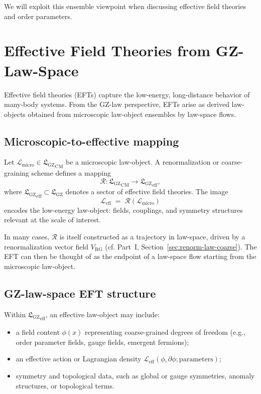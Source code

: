 \documentclass[11pt]{book}
\newcommand{\GZLS}{\ensuremath{\mathfrak{L}_{\mathrm{GZ}}}}
\theoremstyle{plain}
\theoremstyle{definition}
\theoremstyle{remark}
\begin{document}
We will exploit this ensemble viewpoint when discussing effective
field theories and order parameters.

\section{Effective Field Theories from GZ-Law-Space}
\label{sec:eft-from-gzlaw}


Effective field theories (EFTs) capture the low-energy, long-distance
behavior of many-body systems. From the GZ-law perspective, EFTs
arise as derived law-objects obtained from microscopic law-object
ensembles by law-space flows.

\subsection*{Microscopic-to-effective mapping}

Let $\mathcal{L}_{\mathrm{micro}} \in {\GZLS}_{\mathrm{CM}}$ be a
microscopic law-object. A renormalization or coarse-graining scheme
defines a mapping
\[
   \mathcal{R} \colon {\GZLS}_{\mathrm{CM}} \longrightarrow
   {\GZLS}_{\mathrm{eff}},
\]
where ${\GZLS}_{\mathrm{eff}} \subset \GZLS$ denotes a sector of
effective field theories. The image
\[
   \mathcal{L}_{\mathrm{eff}}
   \;=\;
   \mathcal{R}(\mathcal{L}_{\mathrm{micro}})
\]
encodes the low-energy law-object: fields, couplings, and symmetry
structures relevant at the scale of interest.

In many cases, $\mathcal{R}$ is itself constructed as a trajectory
in law-space, driven by a renormalization vector field
$V_{\mathrm{RG}}$ (cf. Part~I, Section~\ref{sec:renorm-law-coarse}).
The EFT can then be thought of as the endpoint of a law-space flow
starting from the microscopic law-object.

\subsection*{GZ-law-space EFT structure}

Within ${\GZLS}_{\mathrm{eff}}$, an effective law-object may include:
\begin{itemize}
  \item a field content $\phi(x)$ representing coarse-grained
        degrees of freedom (e.g., order parameter fields, gauge
        fields, emergent fermions);
  \item an effective action or Lagrangian density
        $\mathcal{L}_{\mathrm{eff}}(\phi,\partial\phi;\text{parameters})$;
  \item symmetry and topological data, such as global or gauge
        symmetries, anomaly structures, or topological terms.
\end{itemize}
\end{document}

